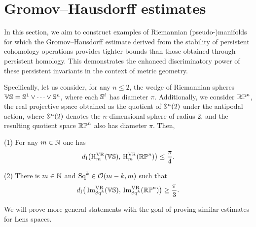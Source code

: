 
\section{Gromov--Hausdorff estimates}\label{prop:db estimate}

In this section, we aim to construct examples of Riemannian (pseudo-)manifolds for which the Gromov--Hausdorff estimate derived from the stability of persistent cohomology operations provides tighter bounds than those obtained through persistent homology.
This demonstrates the enhanced discriminatory power of these persistent invariants in the context of metric geometry.

Specifically, let us consider, for any \(n \leq 2\), the wedge of Riemannian spheres \(\mathbb{V}\mathbb{S} = \mathbb{S}^1 \vee \dots \vee \mathbb{S}^n\), where each \(\mathbb{S}^i\) has diameter \(\pi\).
Additionally, we consider \(\mathbb{RP}^n\), the real projective space obtained as the quotient of \(\mathbb{S}^n(2)\) under the antipodal action, where \(\mathbb{S}^n(2)\) denotes the \(n\)-dimensional sphere of radius 2, and the resulting quotient space \(\mathbb{RP}^n\) also has diameter \(\pi\).
Then,

\medskip (1) For any \(m \in \mathbb{N}\) one has
\[
d_{\mathrm{I}}\big(\mathrm{H}^{\mathrm{VR}}_m(\mathbb{V}\mathbb{S}),\, \mathrm{H}^{\mathrm{VR}}_m(\mathbb{RP}^n)\big) \leq \frac{\pi}{4}.
\]

(2) There is \(m \in \mathbb{N}\) and \(\operatorname{Sq}^k \in \mathcal{O}(m-k, m)\) such that
\[
d_{\mathrm{I}}\big(\operatorname{Im}_{\operatorname{Sq}^k}^{\mathrm{VR}}(\mathbb{V}\mathbb{S}),\, \operatorname{Im}_{\operatorname{Sq}^k}^{\mathrm{VR}}(\mathbb{RP}^n)\big) \geq \frac{\pi}{3}.
\]

We will prove more general statements with the goal of proving similar estimates for Lens spaces.


\subsubsection{}

